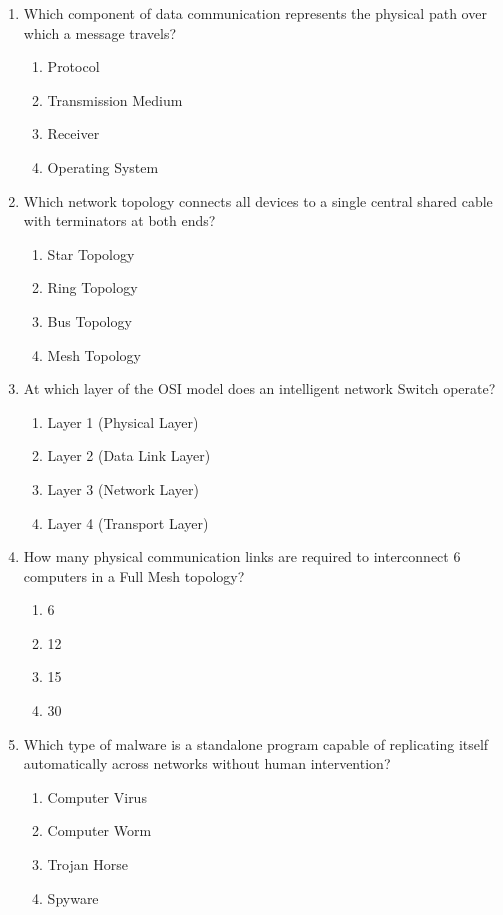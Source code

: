\begin{enumerate}[leftmargin=1.5em]
    \item Which component of data communication represents the physical path over which a message travels?
    \begin{enumerate}[label=(\alph*)]
        \item Protocol
        \item Transmission Medium
        \item Receiver
        \item Operating System
    \end{enumerate}

    \item Which network topology connects all devices to a single central shared cable with terminators at both ends?
    \begin{enumerate}[label=(\alph*)]
        \item Star Topology
        \item Ring Topology
        \item Bus Topology
        \item Mesh Topology
    \end{enumerate}

    \item At which layer of the OSI model does an intelligent network Switch operate?
    \begin{enumerate}[label=(\alph*)]
        \item Layer 1 (Physical Layer)
        \item Layer 2 (Data Link Layer)
        \item Layer 3 (Network Layer)
        \item Layer 4 (Transport Layer)
    \end{enumerate}

    \item How many physical communication links are required to interconnect 6 computers in a Full Mesh topology?
    \begin{enumerate}[label=(\alph*)]
        \item 6
        \item 12
        \item 15
        \item 30
    \end{enumerate}

    \item Which type of malware is a standalone program capable of replicating itself automatically across networks without human intervention?
    \begin{enumerate}[label=(\alph*)]
        \item Computer Virus
        \item Computer Worm
        \item Trojan Horse
        \item Spyware
    \end{enumerate}


\end{enumerate}

